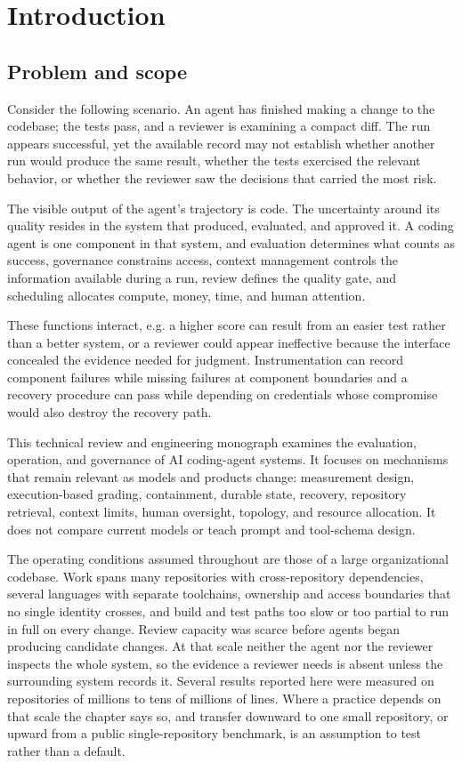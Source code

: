 \chapter*{Introduction}
\hypertarget{problem-and-scope}{%
\section{Problem and scope}\label{problem-and-scope}}

Consider the following scenario. An agent has finished making a change to the codebase; the tests pass, and a reviewer is examining a compact diff. The run appears successful, yet the available record may not establish whether another run would produce the same result, whether the tests exercised the relevant behavior, or whether the reviewer saw the decisions that carried the most risk.

The visible output of the agent's trajectory is code. The uncertainty around its quality resides in the system that produced, evaluated, and approved it. A coding agent is one component in that system, and evaluation determines what counts as success, governance constrains access, context management controls the information available during a run, review defines the quality gate, and scheduling allocates compute, money, time, and human attention.

These functions interact, e.g. a higher score can result from an easier test rather than a better system, or a reviewer could appear ineffective because the interface concealed the evidence needed for judgment. Instrumentation can record component failures while missing failures at component boundaries and a recovery procedure can pass while depending on credentials whose compromise would also destroy the recovery path.

This technical review and engineering monograph examines the evaluation, operation, and governance of AI coding-agent systems. It focuses on mechanisms that remain relevant as models and products change: measurement design, execution-based grading, containment, durable state, recovery, repository retrieval, context limits, human oversight, topology, and resource allocation. It does not compare current models or teach prompt and tool-schema design.

The operating conditions assumed throughout are those of a large organizational codebase. Work spans many repositories with cross-repository dependencies, several languages with separate toolchains, ownership and access boundaries that no single identity crosses, and build and test paths too slow or too partial to run in full on every change. Review capacity was scarce before agents began producing candidate changes. At that scale neither the agent nor the reviewer inspects the whole system, so the evidence a reviewer needs is absent unless the surrounding system records it. Several results reported here were measured on repositories of millions to tens of millions of lines. Where a practice depends on that scale the chapter says so, and transfer downward to one small repository, or upward from a public single-repository benchmark, is an assumption to test rather than a default.

